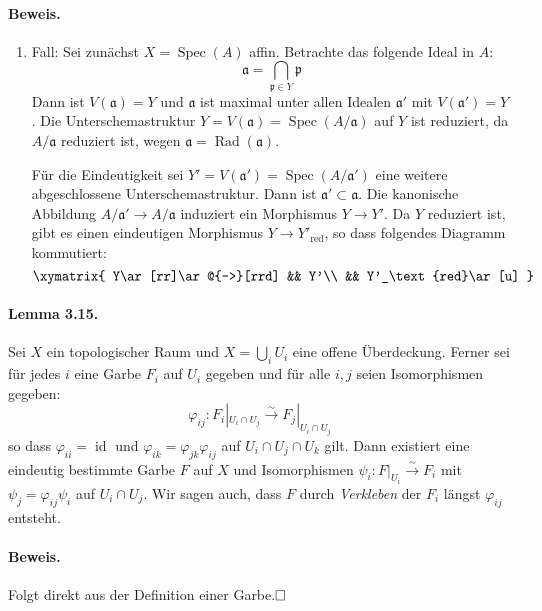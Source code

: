\documentclass[11pt,b5paper,openany]{memoir}
\def \qed {$\hfill\square$}
\begin{document}
\paragraph{Beweis.}
\begin{enumerate}
\item Fall: Sei zunächst $X=\operatorname{Spec}(A)$ affin. Betrachte das folgende Ideal in $A$:
\[\mathfrak{a}=\bigcap_{\mathfrak{p}\in Y}\mathfrak{p} \]
Dann ist $V(\mathfrak{a})=Y$ und $\mathfrak{a}$ ist maximal unter allen Idealen $\mathfrak{a}'$ mit $V(\mathfrak{a}')=Y$. Die Unterschemastruktur $Y=V(\mathfrak{a})=\operatorname{Spec}(A/\mathfrak{a})$ auf $Y$ ist reduziert, da $A/\mathfrak{a}$ reduziert ist, wegen $\mathfrak{a}=\operatorname{Rad}(\mathfrak{a})$.

Für die Eindeutigkeit sei $Y'=V(\mathfrak{a}')=\operatorname{Spec}(A/ \mathfrak{a}')$ eine weitere abgeschlossene Unterschemastruktur. Dann ist $\mathfrak{a}'\subset\mathfrak{a}$. Die kanonische Abbildung $A/\mathfrak{a}'\to A/\mathfrak{a}$ induziert ein Morphismus $Y\to Y'$. Da $Y$ reduziert ist, gibt es einen eindeutigen Morphismus $Y\to Y'_\text{red}$, so dass folgendes Diagramm kommutiert:
\[\xymatrix{
Y\ar[rr]\ar@{-->}[rrd] && Y'\\
&& Y'_\text{red}\ar[u]
} \]
\end{enumerate}
\fi

\paragraph{Lemma 3.15.}\label{3.15} Sei $X$ ein topologischer Raum und $X=\bigcup_i U_i$ eine offene Überdeckung. Ferner sei für jedes $i$ eine Garbe $F_i$ auf $U_i$ gegeben und für alle $i,j$ seien Isomorphismen gegeben:
\[\varphi_{ij}:F_i|_{U_i\cap U_j}\stackrel{\sim}{\to} F_j|_{U_i\cap U_j} \]
so dass $\varphi_{ii}=\operatorname{id}$ und $\varphi_{ik}=\varphi_{jk}\varphi_{ij}$ auf $U_i\cap U_j\cap U_k$ gilt. Dann existiert eine eindeutig bestimmte Garbe $F$ auf $X$ und Isomorphismen $\psi_i:F|_{U_i}\stackrel{\sim}{\to}F_i$ mit $\psi_j=\varphi_{ij}\psi_i$ auf $U_i\cap U_j$. Wir sagen auch, dass $F$ durch \textit{Verkleben} der $F_i$ längst $\varphi_{ij}$ entsteht.

\paragraph{Beweis.} Folgt direkt aus der Definition einer Garbe.\qed
\end{document}
